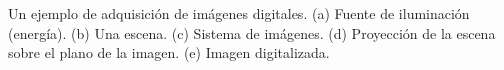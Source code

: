 	Un ejemplo de adquisición de imágenes digitales. (a) Fuente de iluminación (energía). (b) Una escena. (c) Sistema de
	imágenes. (d) Proyección de la escena sobre el plano de la imagen. (e) Imagen digitalizada.

